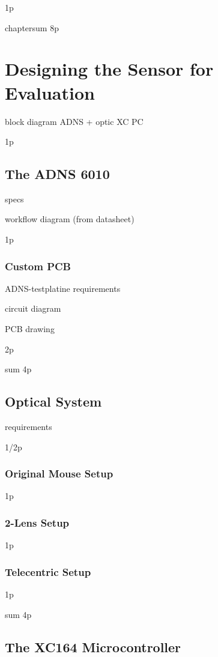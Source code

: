 \documentclass[12pt,a4paper]{article}
\begin{document}
1p


chaptersum 8p

\section{Designing the Sensor for Evaluation}

block diagram
  ADNS + optic
  XC
  PC

1p

\subsection{The ADNS 6010}

specs

workflow diagram (from datasheet)

1p

\subsubsection{Custom PCB}
ADNS-testplatine
  requirements

  circuit diagram

  PCB drawing

2p

sum 4p
  
\subsection{Optical System}
  requirements

1/2p

\subsubsection{Original Mouse Setup}

1p

\subsubsection{2-Lens Setup}

1p

\subsubsection{Telecentric Setup}

1p

sum 4p
\subsection{The XC164 Microcontroller}
\end{document}
